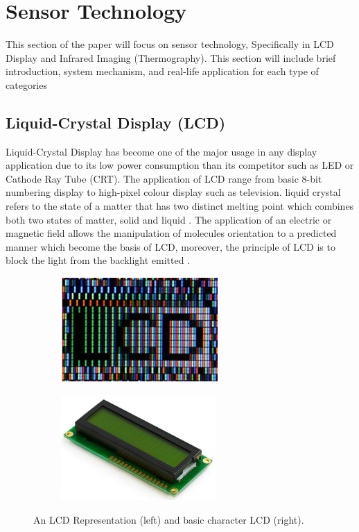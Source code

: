 \justifying
\noindent

\section{Sensor Technology}
This section of the paper will focus on sensor technology, Specifically in LCD Display and Infrared Imaging (Thermography). This section will include brief introduction, system mechanism, and real-life application for each type of categories

\subsection{Liquid-Crystal Display (LCD)}
\noindent Liquid-Crystal Display has become one of the major usage in any display application due to its low power consumption than its competitor such as LED or Cathode Ray Tube (CRT). The application of LCD range from basic 8-bit numbering display to high-pixel colour display such as television. liquid crystal refers to the state of a matter that has two distinct melting point which combines both two states of matter, solid and liquid \cite{AnonymousLCDApplications}\cite{Gurski2005DisplayOverview}. The application of an electric or magnetic field allows the manipulation of molecules orientation to a predicted manner which become the basis of LCD, moreover, the principle of LCD is to block the light from the backlight emitted \cite{Gurski2005DisplayOverview}.\\

\begin{figure}[!ht]
\begin{center}
%    
  \begin{subfigure}[b]{0.4\textwidth}
    \includegraphics[height=4cm]{Figures/LCD_general.PNG}
  \end{subfigure}
  \begin{subfigure}[b]{0.35\textwidth}
    \includegraphics[height=4cm]{Figures/LCD_BASIC.jpg}
  \end{subfigure}
%  
  \caption{An LCD Representation \cite{Gurski2005DisplayOverview} (left) and basic character LCD \cite{AnonymousBasicSystems} (right).}
    \label{fig:basic lcd}
\end{center}
\end{figure}


